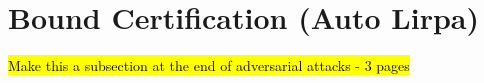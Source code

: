 \chapter{Bound Certification (Auto Lirpa)}

\hl{Make this a subsection at the end of adversarial attacks - 3 pages}